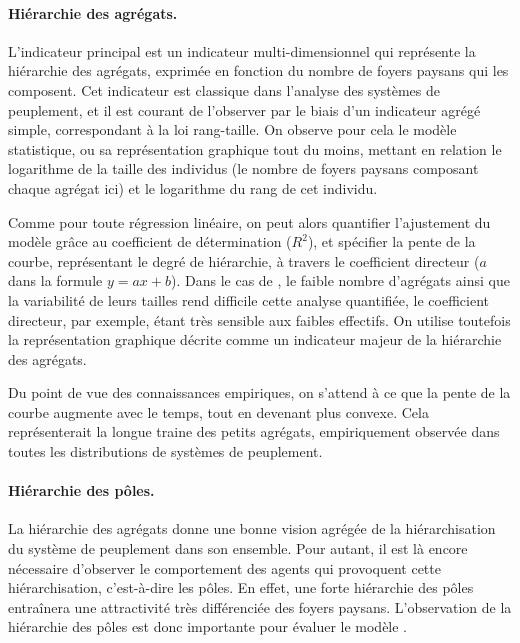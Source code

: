 \paragraph{Hiérarchie des agrégats.}

L'indicateur principal est un indicateur multi-dimensionnel qui représente la hiérarchie des agrégats, exprimée en fonction du nombre de foyers paysans qui les composent.
Cet indicateur est classique dans l'analyse des systèmes de peuplement, et il est courant de l'observer par le biais d'un indicateur agrégé simple, correspondant à la loi rang-taille.
On observe pour cela le modèle statistique, ou sa représentation graphique tout du moins, mettant en relation le logarithme de la taille des individus (le nombre de foyers paysans composant chaque agrégat ici) et le logarithme du rang de cet individu.

Comme pour toute régression linéaire, on peut alors quantifier l'ajustement du modèle grâce au coefficient de détermination ($R^2$), et spécifier la pente de la courbe, représentant le degré de hiérarchie, à travers le coefficient directeur ($a$ dans la formule $y = ax + b$).
Dans le cas de \simfeodal{}, le faible nombre d'agrégats ainsi que la variabilité de leurs tailles rend difficile cette analyse quantifiée, le coefficient directeur, par exemple, étant très sensible aux faibles effectifs.
On utilise toutefois la représentation graphique décrite comme un indicateur majeur de la hiérarchie des agrégats.

Du point de vue des connaissances empiriques, on s'attend à ce que la pente de la courbe augmente avec le temps, tout en devenant plus convexe.
Cela représenterait la \og longue traine\fg{} des petits agrégats, empiriquement observée dans toutes les distributions de systèmes de peuplement.

\paragraph{Hiérarchie des pôles.}

La hiérarchie des agrégats donne une bonne vision agrégée de la hiérarchisation du système de peuplement dans son ensemble.
Pour autant, il est là encore nécessaire d'observer le comportement des agents qui provoquent cette hiérarchisation, c'est-à-dire les pôles.
En effet, une forte hiérarchie des pôles entraînera une attractivité très différenciée des foyers paysans.
L'observation de la hiérarchie des pôles est donc importante pour évaluer le modèle \simfeodal{}.

